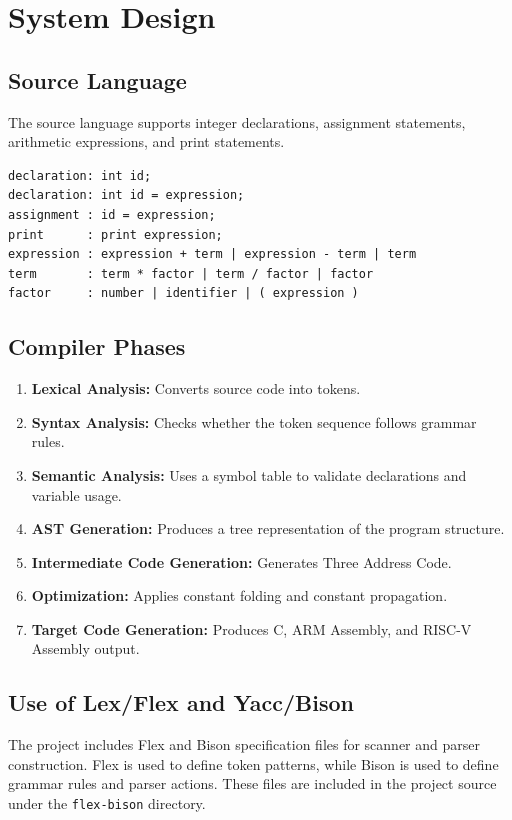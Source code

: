 \documentclass[12pt,a4paper]{report}
\begin{document}
\chapter{System Design}
\section{Source Language}
The source language supports integer declarations, assignment statements, arithmetic expressions, and print statements.

\begin{lstlisting}
declaration: int id;
declaration: int id = expression;
assignment : id = expression;
print      : print expression;
expression : expression + term | expression - term | term
term       : term * factor | term / factor | factor
factor     : number | identifier | ( expression )
\end{lstlisting}

\section{Compiler Phases}
\begin{enumerate}
    \item \textbf{Lexical Analysis:} Converts source code into tokens.
    \item \textbf{Syntax Analysis:} Checks whether the token sequence follows grammar rules.
    \item \textbf{Semantic Analysis:} Uses a symbol table to validate declarations and variable usage.
    \item \textbf{AST Generation:} Produces a tree representation of the program structure.
    \item \textbf{Intermediate Code Generation:} Generates Three Address Code.
    \item \textbf{Optimization:} Applies constant folding and constant propagation.
    \item \textbf{Target Code Generation:} Produces C, ARM Assembly, and RISC-V Assembly output.
\end{enumerate}

\section{Use of Lex/Flex and Yacc/Bison}
The project includes Flex and Bison specification files for scanner and parser construction. Flex is used to define token patterns, while Bison is used to define grammar rules and parser actions. These files are included in the project source under the \texttt{flex-bison} directory.
\end{document}
